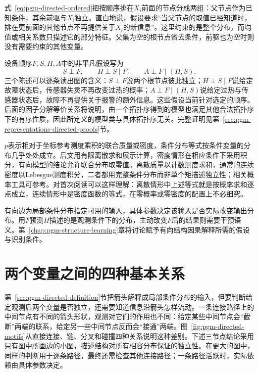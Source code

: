 式~\eqref{eq:pgm-directed-ordered}把按顺序排在$X_i$前面的节点分成两组：父节点作为已知条件，其余前驱与$X_i$独立。直白地说，假设要求“当父节点的取值已经知道时，排在更前面的其他节点不再提供关于$X_i$的新信息”。这里约束的是整个分布，而均值或相关系数只描述它的部分特征。父集为空的根节点省去条件，前驱也为空时则没有需要约束的其他变量。

设备顺序$F,S,H,A$中的非平凡假设写为
\[
  S\perp F,\qquad H\perp S\mid F,\qquad A\perp F\mid(H,S).
\]
三个陈述可以逐条读出图的含义：$S\perp F$说两个根节点彼此独立；$H\perp S\mid F$说给定故障状态后，传感器失灵不再改变过热的概率；$A\perp F\mid(H,S)$说给定过热与传感器状态后，故障不再提供关于报警的额外信息。这些假设当前针对选定的顺序。后面的因子分解等价关系将说明，由一个拓扑序得到的模型也满足其他合法拓扑序下的有序性质，因此所定义的模型类与具体拓扑序无关。完整证明见第~\ref{sec:pgm-representations-directed-proofs}节。

$p$表示相对于坐标参考测度乘积的联合质量或密度，条件分布等式按条件变量的分布几乎处处成立。后文用有限离散求和展示计算，密度情形在相应条件下采用积分，有向模型的结论允许联合分布取零值。离散质量以计数测度求和，通常的连续密度以Lebesgue测度积分，二者都用完整条件分布而非单个矩描述独立性；相关概率工具可参考。对首次阅读可以这样理解：离散情形中上述等式就是按概率求和逐点成立，连续情形中是密度函数的等式，在零概率或零密度的配置上不必细究。

有向边为局部条件分布指定可用的输入，具体参数决定该输入是否实际改变输出分布。用$F$预测$H$描述的是观测条件下的分布，主动改变$F$后的结果则需要干预语义。第~\ref{chap:pgm-structure-learning}章将讨论赋予有向结构因果解释所需的假设与识别条件。

\section{两个变量之间的四种基本关系}
\label{sec:pgm-directed-motifs}

第~\ref{sec:pgm-directed-definition}节把箭头解释成局部条件分布的输入，但要判断给定观测后两个变量是否独立，还需要知道信息沿箭头怎样流动。一条连接路径上的中间节点有不同的箭头形状，观测对它们的作用也不同：给定某些中间节点会“截断”两端的联系，给定另一些中间节点反而会“接通”两端。图~\ref{fig:pgm-directed-motifs}从直接连接、链、分叉和碰撞四种关系说明这种差别。下述三节点结论采用只有图中所画边的小图，描述结构对所有相容分布保证的独立性。在更大的图中，同样的判断用于逐条路径，最终还需检查其他连接路径；一条路径活跃时，实际依赖由具体参数决定。


